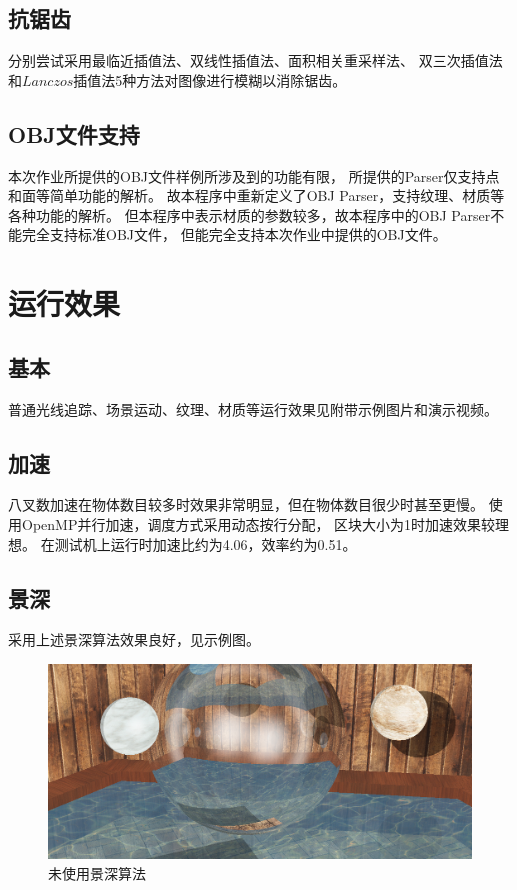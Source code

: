 \subsection{抗锯齿}
分别尝试采用最临近插值法、双线性插值法、面积相关重采样法、%
双三次插值法和$Lanczos$插值法5种方法对图像进行模糊以消除锯齿。%

\subsection{OBJ文件支持}
本次作业所提供的OBJ文件样例所涉及到的功能有限，%
所提供的Parser仅支持点和面等简单功能的解析。%
故本程序中重新定义了OBJ Parser，支持纹理、材质等各种功能的解析。%
但本程序中表示材质的参数较多，故本程序中的OBJ Parser不能完全支持标准OBJ文件，%
但能完全支持本次作业中提供的OBJ文件。

\section{运行效果}
\subsection{基本}
普通光线追踪、场景运动、纹理、材质等运行效果见附带示例图片和演示视频。

\subsection{加速}
八叉数加速在物体数目较多时效果非常明显，但在物体数目很少时甚至更慢。%
使用OpenMP并行加速，调度方式采用动态按行分配，%
区块大小为1时加速效果较理想。%
在测试机上运行时加速比约为4.06，效率约为0.51。

\subsection{景深}
采用上述景深算法效果良好，见示例图。

\begin{figure}[!htbp]
    \centering
    \includegraphics[width=\columnwidth]{org2}
    \caption{未使用景深算法}\label{fig:dofcon}
\end{figure}


